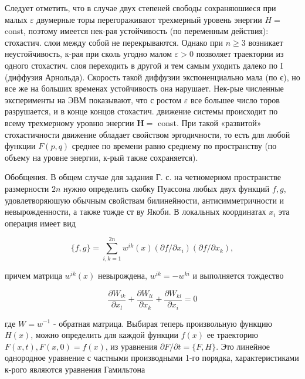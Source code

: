 \documentclass[10pt]{article}
\begin{document}
Следует отметить, что в случае двух степеней свободы сохраняюшиеся при малых $\varepsilon$ двумерные торы перегораживают трехмерный уровень энергии $H=$ const, поэтому имеется нек-рая устойчивость (по переменным действия): стохастич. слои между собой не перекрываются. Однако при $n \geqslant 3$ возникает неустойчивость, к-рая при сколь угодно малом $\varepsilon>0$ позволяет траектории из одного стохастич. слоя переходить в другой и тем самым уходить далеко по I (диффузия Арнольда). Скорость такой диффузии экспоненциально мала (по є), но все же на больших временах устойчивость она нарушает. Нек-рые численные эксперименты на ЭВМ показывают, что с ростом $\varepsilon$ все большее число торов разрушается, и в конце концов стохастич. движение системы происходит по всему трехмерному уровню энергии $\boldsymbol{H}=$ const. При такой «развитой» стохастичности движение обладает свойством эргодичности, то есть для любой функции $F(p, q)$ среднее по времени равно среднему по пространству (по объему на уровне энергии, к-рый также сохраняется).



Обобщения. В общем случае для задания Г. с. на четномерном пространстве размерности $2 n$ нужно определить скобку Пуассона любых двух функций $f, g$, удовлетворяюшую обычным свойствам билинейности, антисимметричности и невырожденности, а также тожде ст ву Якоби. В локальных координатах $x_{i}$ эта операция имеет вид



\[

\{f, g\}=\sum_{i, k=1}^{2 n} w^{i k}(x)\left(\partial f / \partial x_{i}\right)\left(\partial f / \partial x_{k}\right),

\]



причем матрица $w^{i k}(x)$ невырождена, $w^{i k}=-w^{k i}$ и выполняется тождество



\[

\frac{\partial W_{i k}}{\partial x_{l}}+\frac{\partial W_{l i}}{\partial x_{k}}+\frac{\partial W_{k l}}{\partial x_{i}}=0

\]



где $W=w^{-1}$ - обратная матрица. Выбирая теперь произвольную функцию $H(x)$, можно определить для каждой функции $f(x)$ ее траекторию $F(x, t), F(x, 0)=f(x)$, из уравнения $\partial F / \partial t=\{F, H\}$. Это линейное однородное уравнение с частными производными 1-го порядка, характеристиками к-рого являются уравнения Гамильтона
\end{document}
